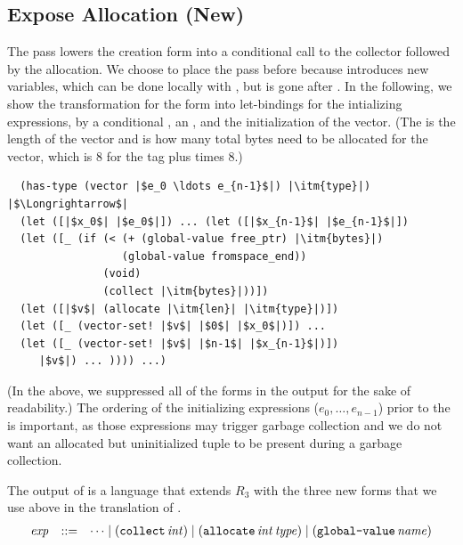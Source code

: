 \documentclass[11pt]{book}
\begin{document}
\subsection{Expose Allocation (New)}
\label{sec:expose-allocation}

The pass  lowers the  creation
form into a conditional call to the collector followed by the
allocation. We choose to place the  pass
before  because  introduces new
variables, which can be done locally with , but 
is gone after .  In the following, we show the
transformation for the  form into let-bindings for the
intializing expressions, by a conditional , an
, and the initialization of the vector.
(The  is the length of the vector and  is how many
total bytes need to be allocated for the vector, which is 8 for the
tag plus  times 8.)

\begin{lstlisting}
  (has-type (vector |$e_0 \ldots e_{n-1}$|) |\itm{type}|)
|$\Longrightarrow$|
  (let ([|$x_0$| |$e_0$|]) ... (let ([|$x_{n-1}$| |$e_{n-1}$|])
  (let ([_ (if (< (+ (global-value free_ptr) |\itm{bytes}|)
                  (global-value fromspace_end))
               (void)
               (collect |\itm{bytes}|))])
  (let ([|$v$| (allocate |\itm{len}| |\itm{type}|)])
  (let ([_ (vector-set! |$v$| |$0$| |$x_0$|)]) ...
  (let ([_ (vector-set! |$v$| |$n-1$| |$x_{n-1}$|)])
     |$v$|) ... )))) ...)
\end{lstlisting}
(In the above, we suppressed all of the  forms in the
output for the sake of readability.)  The ordering of the initializing
expressions ($e_0,\ldots,e_{n-1}$) prior to the  is
important, as those expressions may trigger garbage collection and we
do not want an allocated but uninitialized tuple to be present during
a garbage collection.

The output of  is a language that extends
$R_3$ with the three new forms that we use above in the translation of
.
\[
\begin{array}{lcl}
  \mathit{exp} &::=& \cdots
      \mid (\texttt{collect} \,\mathit{int})
      \mid (\texttt{allocate} \,\mathit{int}\,\mathit{type})
      \mid (\texttt{global-value} \,\mathit{name})
\end{array}
\]

%
\end{document}
